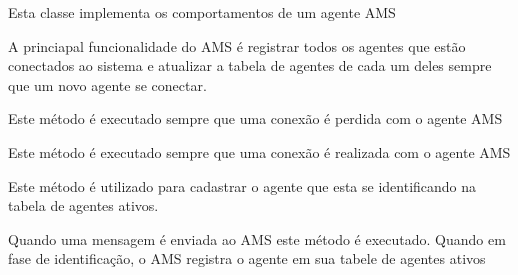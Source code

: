 \documentclass[letterpaper,10pt,brazil]{sphinxmanual}
\begin{document}
\begin{fulllineitems}
\label{api:pade.core.ams.AgentManagementProtocol}
Esta classe implementa os comportamentos de um agente AMS

A princiapal funcionalidade do AMS é registrar todos os agentes que
estão conectados ao sistema e atualizar a tabela de agentes de cada
um deles sempre que um novo agente se conectar.

\begin{fulllineitems}
\label{api:pade.core.ams.AgentManagementProtocol.connectionLost}
Este método é executado sempre que uma conexão é perdida
com o agente AMS

\end{fulllineitems}


\begin{fulllineitems}
\label{api:pade.core.ams.AgentManagementProtocol.connectionMade}
Este método é executado sempre que uma conexão é realizada
com o agente AMS

\end{fulllineitems}


\begin{fulllineitems}
\label{api:pade.core.ams.AgentManagementProtocol.handle_identif}
Este método é utilizado para cadastrar o agente que esta se identificando
na tabela de agentes ativos.

\end{fulllineitems}


\begin{fulllineitems}
\label{api:pade.core.ams.AgentManagementProtocol.lineReceived}
Quando uma mensagem é enviada ao AMS este método é executado.
Quando em fase de identificação, o AMS registra o agente
em sua tabele de agentes ativos

\end{fulllineitems}


\end{fulllineitems}
\end{document}
